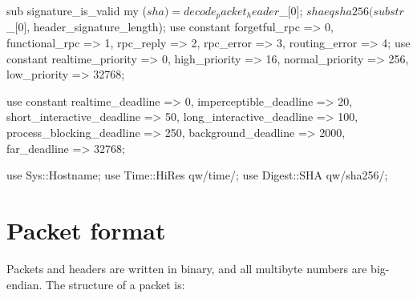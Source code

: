 \documentclass{report}
\begin{document}
\begin{perlcode}
sub signature_is_valid {
  my ($sha) = decode_packet_header $_[0];
  $sha eq sha256(substr $_[0], header_signature_length);
}
use constant {forgetful_rpc  => 0,
              functional_rpc => 1,
              rpc_reply      => 2,
              rpc_error      => 3,
              routing_error  => 4};
use constant {realtime_priority => 0,
              high_priority     => 16,
              normal_priority   => 256,
              low_priority      => 32768};

use constant {realtime_deadline          => 0,
              imperceptible_deadline     => 20,
              short_interactive_deadline => 50,
              long_interactive_deadline  => 100,
              process_blocking_deadline  => 250,
              background_deadline        => 2000,
              far_deadline               => 32768};



\begin{perlcode}
use Sys::Hostname;
use Time::HiRes qw/time/;
use Digest::SHA qw/sha256/; \end{perlcode}


\section{Packet format}\label{sec:packet-format}
    Packets and headers are written in binary, and all multibyte numbers are
    big-endian. The structure of a packet is:


\end{perlcode}
\end{document}
